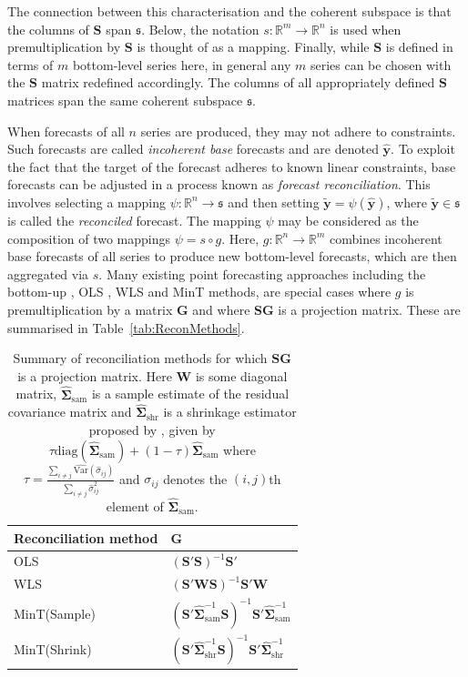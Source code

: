 \documentclass[a4paper,12pt]{article}
\def\var{\text{Var}}
\theoremstyle{definition}
\begin{document}
The connection between this characterisation and the coherent subspace is that the columns of $\bm{S}$ span $\mathfrak{s}$. Below, the notation $s:\mathbb{R}^m\rightarrow\mathbb{R}^n$ is used when premultiplication by $\bm{S}$ is thought of as a mapping. Finally, while $\bm{S}$ is defined in terms of $m$ bottom-level series here, in general any $m$ series can be chosen with the $\bm{S}$ matrix redefined accordingly. The columns of all appropriately defined $\bm{S}$ matrices span the same coherent subspace $\mathfrak{s}$.

When forecasts of all $n$ series are produced, they may not adhere to constraints. Such forecasts are called \emph{incoherent base} forecasts and are denoted $\hat{\bm{y}}$. To exploit the fact that the target of the forecast adheres to known linear constraints, base forecasts can be adjusted in a process known as \emph{forecast reconciliation}. This involves selecting a mapping $\psi:\mathbb{R}^n\rightarrow\mathfrak{s}$ and then setting $\tilde{\bm{y}}=\psi(\hat{\bm{y}})$, where $\tilde{\bm{y}}\in\mathfrak{s}$ is called the \emph{reconciled} forecast. The mapping $\psi$ may be considered as the composition of two mappings $\psi=s\circ g$. Here, $g:\mathbb{R}^{n}\rightarrow\mathbb{R}^{m}$ combines incoherent base forecasts of all series to produce new bottom-level forecasts, which are then aggregated via $s$. Many existing point forecasting approaches including the bottom-up \citep{Dunn1976}, OLS \citep{HynEtAl2011}, WLS \citep[][]{AthEtAl2017} and MinT \citep{WicEtAl2019} methods, are special cases where $g$ is premultiplication by a matrix $\bm{G}$ and where $\bm{S}\bm{G}$ is a projection matrix. These are summarised in Table~\ref{tab:ReconMethods}.

\begin{table}[!htb]
	\caption{Summary of reconciliation methods for which $\bm{S}\bm{G}$ is a projection matrix. Here $\bm{W}$ is some diagonal matrix, $\hat{\bm{\Sigma}}_{\text{sam}}$ is a sample estimate of the residual covariance matrix and $\hat{\bm{\Sigma}}_{\text{shr}}$ is a shrinkage estimator proposed by \citet{Schafer2005}, given by $\tau \textrm{diag}(\hat{\bm{\Sigma}}_{\text{sam}})+(1-\tau)\hat{\bm{\Sigma}}_{\text{sam}}$ where $\tau = \displaystyle\frac{\sum_{i \neq j}\hat{\var}(\hat{\sigma}_{ij})}{\sum_{i \neq j}{\hat{\sigma}}^2_{ij}}$ and $\sigma_{ij}$ denotes the $(i,j)$th element of $\hat{\bm{\Sigma}}_{\text{sam}}$.} \label{tab:ReconMethods}
	\centering
	\begin{tabular}{l@{\hskip 0.4in}l}
		\toprule
		\textbf{Reconciliation method} & $\bm{G}$ \\
		\midrule
		OLS             & $(\bm{S}'\bm{S})^{-1}\bm{S}'$ \\
		WLS             & $(\bm{S}'\bm{W}\bm{S})^{-1}\bm{S}'\bm{W}$ \\
		MinT(Sample)    & $(\bm{S}'\hat{\bm{\Sigma}}_{\text{sam}}^{-1}\bm{S})^{-1}\bm{S}' \hat{\bm{\Sigma}}_{\text{sam}}^{-1}$  \\
		MinT(Shrink)    & $(\bm{S}'\hat{\bm{\Sigma}}_{\text{shr}}^{-1}\bm{S})^{-1}\bm{S}' \hat{\bm{\Sigma}}_{\text{shr}}^{-1}$  \\
		\bottomrule
	\end{tabular}
	\label{tab:recomethods}
\end{table}
\end{document}
